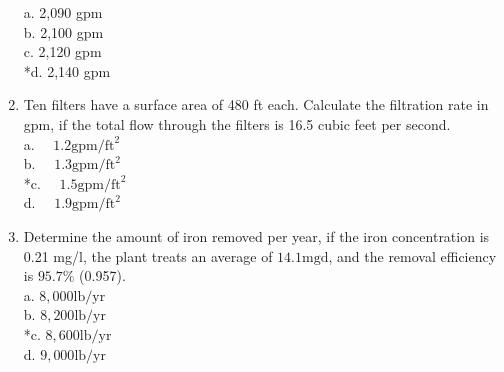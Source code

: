 \begin{enumerate}
a. 2,090 gpm\\
b. 2,100 gpm\\
c. 2,120 gpm\\
*d. 2,140 gpm\\
\item Ten filters have a surface area of 480 ft each. Calculate the filtration rate in gpm, if the total flow through the filters is 16.5 cubic feet per second.\\
a. $\quad 1.2 \mathrm{gpm} / \mathrm{ft}^{2}$\\
b. $\quad 1.3 \mathrm{gpm} / \mathrm{ft}^{2}$\\
*c. $\quad 1.5 \mathrm{gpm} / \mathrm{ft}^{2}$\\
d. $\quad 1.9 \mathrm{gpm} / \mathrm{ft}^{2}$\\
\item Determine the amount of iron removed per year, if the iron concentration is 0.21 mg/l, the plant treats an average of $14.1 \mathrm{mgd}$, and the removal efficiency is $95.7 \%$ (0.957).\\
a. $8,000 \mathrm{lb} / \mathrm{yr}$\\
b. $8,200 \mathrm{lb} / \mathrm{yr}$\\
*c. $8,600 \mathrm{lb} / \mathrm{yr}$\\
d. $9,000 \mathrm{lb} / \mathrm{yr}$\\
\end{enumerate}
\newpage
